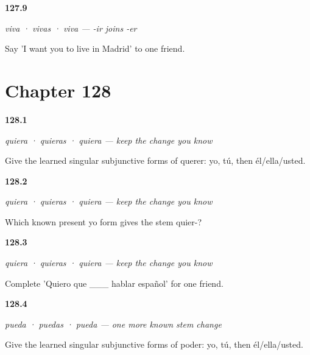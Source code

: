 \noindent\begin{minipage}[t]{\linewidth}
\raggedright
\hypertarget{review-ES-C18-vivir-subjuntivo-wanted}{\textbf{127.9}} \emph{viva · vivas · viva — -ir joins -er}\par
\small Say 'I want you to live in Madrid' to one friend.
\end{minipage}\par\medskip

\section*{Chapter 128}

\noindent\begin{minipage}[t]{\linewidth}
\raggedright
\hypertarget{review-ES-C18-querer-subjuntivo-forms}{\textbf{128.1}} \emph{quiera · quieras · quiera — keep the change you know}\par
\small Give the learned singular subjunctive forms of querer: yo, tú, then él/ella/usted.
\end{minipage}\par\medskip

\noindent\begin{minipage}[t]{\linewidth}
\raggedright
\hypertarget{review-ES-C18-querer-subjuntivo-stem}{\textbf{128.2}} \emph{quiera · quieras · quiera — keep the change you know}\par
\small Which known present yo form gives the stem quier-?
\end{minipage}\par\medskip

\noindent\begin{minipage}[t]{\linewidth}
\raggedright
\hypertarget{review-ES-C18-querer-subjuntivo-wanted}{\textbf{128.3}} \emph{quiera · quieras · quiera — keep the change you know}\par
\small Complete 'Quiero que \_\_\_ hablar español' for one friend.
\end{minipage}\par\medskip

\noindent\begin{minipage}[t]{\linewidth}
\raggedright
\hypertarget{review-ES-C18-poder-subjuntivo-forms}{\textbf{128.4}} \emph{pueda · puedas · pueda — one more known stem change}\par
\small Give the learned singular subjunctive forms of poder: yo, tú, then él/ella/usted.
\end{minipage}\par\medskip

